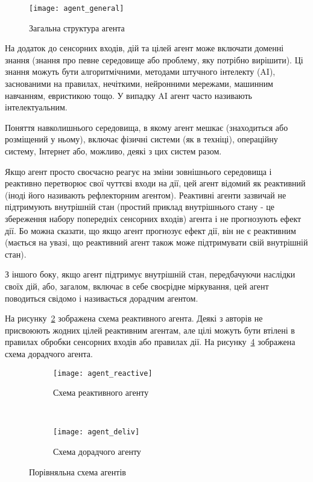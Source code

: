 \begin{figure}[H]
	\centering
	\texttt{[image: agent\_general]}
	\caption{Загальна структура агента}
	\label{fig:agent_general}
\end{figure}

На додаток до сенсорних входів, дій та цілей агент може включати доменні знання (знання про певне середовище або проблему, яку потрібно вирішити). Ці знання можуть бути алгоритмічними, методами штучного інтелекту (AI), заснованими на правилах, нечіткими, нейронними мережами, машинним навчанням, евристикою тощо. У випадку AI агент часто називають інтелектуальним.

Поняття навколишнього середовища, в якому агент мешкає (знаходиться або розміщений у ньому), включає фізичні системи (як в техніці), операційну систему, Інтернет або, можливо, деякі з цих систем разом.

Якщо агент просто своєчасно реагує на зміни зовнішнього середовища і реактивно перетворює свої чуттєві входи на дії, цей агент відомий як реактивний (іноді його називають рефлекторним агентом). Реактивні агенти зазвичай не підтримують внутрішній стан (простий приклад внутрішнього стану - це збереження набору попередніх сенсорних входів) агента і не прогнозують ефект дії. Бо можна сказати, що якщо агент прогнозує ефект дії, він не є реактивним (мається на увазі, що реактивний агент також може підтримувати свій внутрішній стан).

З іншого боку, якщо агент підтримує внутрішній стан, передбачуючи наслідки своїх дій, або, загалом, включає в себе своєрідне міркування, цей агент поводиться свідомо і називається дорадчим агентом.

На рисунку~\ref{fig:agent_reactive} зображена схема реактивного агента. Деякі з авторів не присвоюють жодних цілей реактивним агентам, але цілі можуть бути втілені в правилах обробки сенсорних входів або правилах дії.
На рисунку~\ref{fig:agent_deliv} зображена схема дорадчого агента.

\begin{figure}[H]
	\centering
	\begin{subfigure}[b]{0.49\textwidth}
		\texttt{[image: agent\_reactive]}
		\caption{Схема реактивного агенту}
		\label{fig:agent_reactive}
	\end{subfigure}
	~
	\begin{subfigure}[b]{0.49\textwidth}
		\texttt{[image: agent\_deliv]}
		\caption{Схема дорадчого агенту}
		\label{fig:agent_deliv}
	\end{subfigure}
    \caption{Порівняльна схема агентів}
\end{figure}

